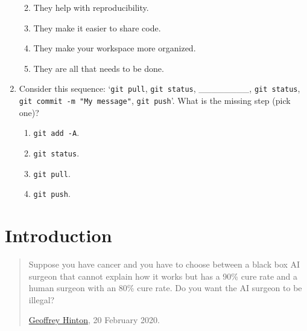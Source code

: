 \documentclass[
]{book}
\providecommand{\tightlist}{%
  \setlength{\itemsep}{0pt}\setlength{\parskip}{0pt}}
\begin{document}
\begin{enumerate}
  \begin{enumerate}
  \def\labelenumii{\alph{enumii}.}
  \tightlist
  \item
    They help with reproducibility.
  \item
    They make it easier to share code.
  \item
    They make your workspace more organized.
  \item
    They are all that needs to be done.
  \end{enumerate}
\item
  Consider this sequence: `\texttt{git\ pull}, \texttt{git\ status}, \_\_\_\_\_\_\_\_, \texttt{git\ status}, \texttt{git\ commit\ -m\ "My\ message"}, \texttt{git\ push}'. What is the missing step (pick one)?

  \begin{enumerate}
  \def\labelenumii{\alph{enumii}.}
  \tightlist
  \item
    \texttt{git\ add\ -A}.
  \item
    \texttt{git\ status}.
  \item
    \texttt{git\ pull}.
  \item
    \texttt{git\ push}.
  \end{enumerate}
\end{enumerate}

\hypertarget{introduction-1}{%
\section{Introduction}\label{introduction-1}}

\begin{quote}
Suppose you have cancer and you have to choose between a black box AI surgeon that cannot explain how it works but has a 90\% cure rate and a human surgeon with an 80\% cure rate. Do you want the AI surgeon to be illegal?

\href{https://twitter.com/geoffreyhinton/status/1230592238490615816?s=21}{Geoffrey Hinton}, 20 February 2020.
\end{quote}
\end{document}
